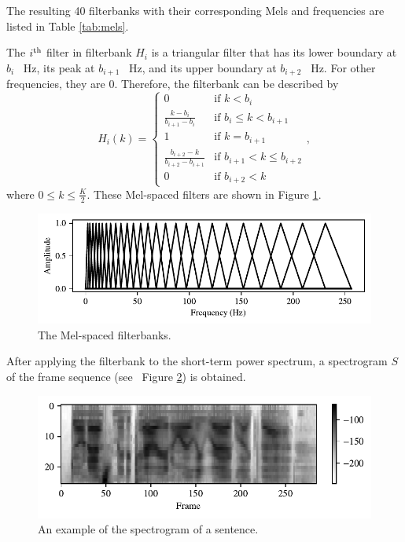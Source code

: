 			The resulting 40 filterbanks with their corresponding Mels and frequencies are listed in Table \ref{tab:mels}.

			The $i\textsuperscript{th}$ filter in filterbank $H_i$ is a triangular filter that has its lower boundary at $b_{i}$ \SI{}{\Hz}, its peak at $b_{i+1}$ \SI{}{\Hz}, and its upper boundary at $b_{i+2}$ \SI{}{\Hz}.
			For other frequencies, they are 0.
			Therefore, the filterbank can be described by
			\begin{equation}
				H_i(k) = \begin{cases}
					0 & \mbox{if } k<b_i\\
					\frac{k-b_i}{b_{i+1}-b_i} & \mbox{if } b_i\leq k < b_{i+1} \\
					1 & \mbox{if } k = b_{i+1} \\
					\frac{b_{i+2} - k}{b_{i+2}-b_{i+1}} & \mbox{if } b_{i+1} < k \leq b_{i+2}\\
					0 & \mbox{if } b_{i+2} < k
				\end{cases},
			\end{equation}
			where $0 \leq k \leq \frac{K}{2}$.
			These Mel-spaced filters are shown in Figure \ref{fig:filterbank}.
			\begin{figure}[ht]
				\centering
			    \includegraphics[width=\linewidth]{gfx/fbanks}
			    \caption[Mel-spaced filterbanks]{The Mel-spaced filterbanks.}
			    \label{fig:filterbank}
			\end{figure}

			After applying the filterbank to the short-term power spectrum, a spectrogram $S$ of the frame sequence (see \eg~Figure \ref{fig:spectrogram}) is obtained.

			\begin{figure}[ht]
				\centering
			    \includegraphics[width=\linewidth]{gfx/spectrogram}
			    \caption[Spectrogram]{An example of the spectrogram of a sentence.}
			    \label{fig:spectrogram}
			\end{figure}

